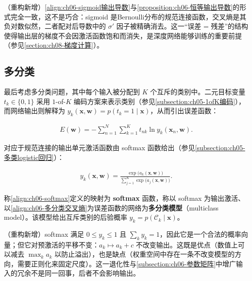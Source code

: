 \documentclass[../../main.tex]{subfiles}
\begin{document}
\begin{remark}（重构新增）\eqref{align:ch06-sigmoid输出导数}与\cref{proposition:ch06-恒等输出导数}的形式完全一致，这不是巧合：sigmoid 是Bernoulli分布的规范连接函数，交叉熵是其负对数似然，二者配对后导数中的 $\sigma'$ 因子被精确消去。这一“误差 = 残差”的结构使得输出层的梯度不会因激活函数饱和而消失，是深度网络能够训练的重要前提（参见\cref{section:ch08-梯度计算}）。
\end{remark}

\subsection{多分类}\label{subsection:ch06-多分类}

最后考虑多分类问题，其中每个输入被分配到 $K$ 个互斥的类别中。二元目标变量 $t_k\in\{0,1\}$ 采用 $1$-of-$K$ 编码方案来表示类别（参见\cref{subsection:ch05-1ofK编码}），而网络输出则解释为 $y_k(\boldsymbol{x},\boldsymbol{w})=p(t_k=1\mid\boldsymbol{x})$，从而引出误差函数：

\begin{align}
E(\boldsymbol{w})=-\sum_{n=1}^{N}\sum_{k=1}^{K}t_{nk}\ln y_k(\boldsymbol{x}_n,\boldsymbol{w}).
\label{align:ch06-多分类交叉熵}
\end{align}

对应于规范连接的输出单元激活函数由 softmax 函数给出（参见\cref{subsection:ch05-多类logistic回归}）：

\begin{align}
y_k(\boldsymbol{x},\boldsymbol{w})=\frac{\exp\bigl(a_k(\boldsymbol{x},\boldsymbol{w})\bigr)}{\sum_{j=1}^{K}\exp\bigl(a_j(\boldsymbol{x},\boldsymbol{w})\bigr)}.
\label{align:ch06-softmax}
\end{align}

\begin{definition}\label{definition:ch06-softmax模型}
称\eqref{align:ch06-softmax}定义的映射为 \textbf{softmax} 函数，称以 softmax 为输出激活、以\eqref{align:ch06-多分类交叉熵}为误差函数的网络为\textbf{多分类模型}（multiclass model）。该模型给出互斥类别的后验概率 $y_k=p(\mathcal{C}_k\mid\boldsymbol{x})$。
\end{definition}

\begin{remark}（重构新增）softmax 满足 $0\leqslant y_k\leqslant1$ 且 $\sum_ky_k=1$，因此它是一个合法的概率向量；但它对预激活的平移不变：$a_k\mapsto a_k+c$ 不改变输出。这既是优点（数值上可以减去 $\max_ka_k$ 以防止溢出），也是缺点（权重空间中存在一条不改变模型的方向，需要正则化来固定尺度）。这一退化性与\cref{subsection:ch06-参数矩阵}中增广输入的冗余不是同一回事，后者不会影响输出。
\end{remark}
\end{document}
